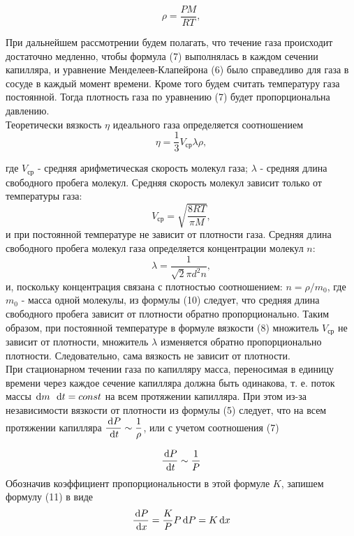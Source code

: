 \documentclass[a4paper]{article}
\begin{document}
\begin{equation}
    \rho = \dfrac{PM}{RT},
\end{equation}

При дальнейшем рассмотрении будем полагать, что течение газа
происходит достаточно медленно, чтобы формула (7) выполнялась
в каждом сечении капилляра, и уравнение Менделеев-Клапейрона
(6) было справедливо для газа в сосуде в каждый момент времени. Кроме того будем считать температуру газа постоянной.
Тогда плотность газа по уравнению (7) будет пропорциональна
давлению.\\
Теоретически вязкость $\eta$ идеального газа определяется соотношением
\begin{equation}
    \eta = \dfrac{1}{3}V_{\text{ср}}\lambda \rho,
\end{equation}

где $V_{\text{ср}}$ - средняя арифметическая скорость молекул газа; $\lambda$ -
средняя длина свободного пробега молекул. Средняя скорость
молекул зависит только от температуры газа:
\begin{equation}
    V_{\text{ср}} = \sqrt{\dfrac{8RT}{\pi M}},
\end{equation}
и при постоянной температуре не зависит от плотности газа.
Средняя длина свободного пробега молекул газа определяется
концентрации молекул $n$:
\begin{equation}
    \lambda = \dfrac{1}{\sqrt{2}\pi d^2 n },
\end{equation}
и, поскольку концентрация связана с плотностью соотношением: $n = \rho/m_0$, где $m_0$ - масса одной молекулы, из формулы (10)
следует, что средняя длина свободного пробега зависит от плотности обратно пропорционально. Таким образом, при постоянной
температуре в формуле вязкости (8) множитель $V_{\text{ср}}$ не зависит
от плотности, множитель $\lambda$ изменяется обратно пропорционально
плотности. Следовательно, сама вязкость не зависит от плотности.\\
При стационарном течении газа по капилляру масса, переносимая в единицу времени через каждое сечение капилляра должна быть одинакова, т. е. поток массы $\dl m$ 
$\dl t = const$ на всем протяжении капилляра. При этом из-за независимости вязкости от
плотности из формулы (5) следует, что на всем протяжении капилляра $\dfrac{\dl P}{\dl t}\sim \dfrac{1}{\rho}$, или с учетом соотношения (7)

\begin{equation}
    \dfrac{\dl P}{\dl t} \sim \dfrac{1}{P}
\end{equation}
Обозначив коэффициент пропорциональности в этой формуле $K$,
запишем формулу (11) в виде
\begin{equation}
    \dfrac{\dl P}{\dl x} = \dfrac{K}{P}P\dl P = K\dl x
\end{equation}
\end{document}

